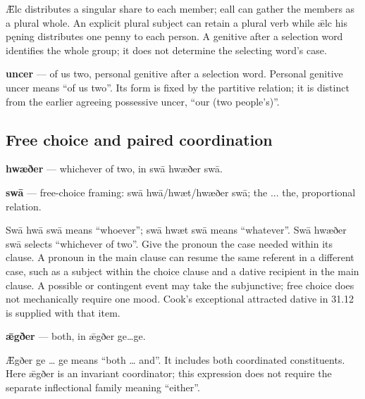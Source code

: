 Ǣlc distributes a singular share to each member; eall can gather the members as a plural whole. An explicit plural subject can retain a plural verb while ǣlc his pęning distributes one penny to each person. A genitive after a selection word identifies the whole group; it does not determine the selecting word’s case.

\textbf{uncer} — of us two, personal genitive after a selection word. Personal genitive uncer means “of us two”. Its form is fixed by the partitive relation; it is distinct from the earlier agreeing possessive uncer, “our (two people’s)”.

\subsection*{Free choice and paired coordination}

\textbf{hwæðer} — whichever of two, in swā hwæðer swā.

\textbf{swā} — free-choice framing: swā hwā/\allowbreak{}hwæt/\allowbreak{}hwæðer swā; the ... the, proportional relation.

Swā hwā swā means “whoever”; swā hwæt swā means “whatever”. Swā hwæðer swā selects “whichever of two”. Give the pronoun the case needed within its clause. A pronoun in the main clause can resume the same referent in a different case, such as a subject within the choice clause and a dative recipient in the main clause. A possible or contingent event may take the subjunctive; free choice does not mechanically require one mood. Cook’s exceptional attracted dative in 31.12 is supplied with that item.

\textbf{ǣgðer} — both, in ǣgðer ge…ge.

Ǣgðer ge … ge means “both … and”. It includes both coordinated constituents. Here ǣgðer is an invariant coordinator; this expression does not require the separate inflectional family meaning “either”.

